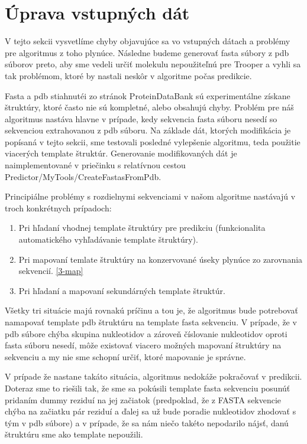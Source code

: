 \section{Úprava vstupných dát}
V tejto sekcii vysvetlíme chyby objavujúce sa vo vstupných dátach a problémy pre algoritmus z toho plynúce. Následne budeme generovať fasta súbory z pdb súborov preto, aby sme vedeli určiť molekulu nepoužiteľnú pre Trooper a vyhli sa tak problémom, ktoré by nastali neskôr v algoritme počas predikcie.


\indent Fasta a pdb stiahnutéi zo stránok ProteinDataBank sú experimentálne získane štruktúry, ktoré často nie sú kompletné, alebo obsahujú chyby. Problém pre náš algoritmus nastáva hlavne v prípade, kedy sekvencia fasta súboru nesedí so sekvenciou extrahovanou z pdb súboru. Na základe dát, ktorých modifikácia je popísaná v tejto sekcii, sme testovali posledné vylepšenie algoritmu, teda použitie viacerých template štruktúr. Generovanie modifikovaných dát je naimplementované v priečinku s relatívnou cestou Predictor/MyTools/CreateFastasFromPdb.


\indent Principiálne problémy s rozdielnymi sekvenciami v našom algoritme nastávajú v troch konkrétnych prípadoch: 

\begin{enumerate}
\item Pri hľadaní vhodnej template štruktúry pre predikciu (funkcionalita automatického vyhľadávanie template štruktúry).
\item Pri mapovaní temlate štruktúry na konzervované úseky plynúce zo zarovnania sekvencií. \autoref{3-map}
\item Pri hľadaní a mapovaní sekundárných template štruktúr. 
\end{enumerate}

\indent Všetky tri situácie majú rovnakú príčinu a tou je, že algoritmus bude potrebovať namapovať template pdb štruktúru na template fasta sekvenciu. V prípade, že v pdb súbore chýba skupina nukleotidov a zároveň číslovanie nukleotidov oproti fasta súboru nesedí, môže existovať viacero možných mapovaní štruktúry na sekvenciu a my nie sme schopní určiť, ktoré mapovanie je správne.


\indent V prípade že nastane takáto situácia, algoritmus nedokáže pokračovať v predikcii. Doteraz sme to riešili tak, že sme sa pokúsili template fasta sekvenciu posunúť pridaním dummy reziduí na jej začiatok (predpoklad, že z FASTA sekvencie chýba na začiatku pár reziduí a ďalej sa už bude poradie nukleotidov zhodovať s tým v pdb súbore) a v prípade, že sa nám niečo takéto nepodarilo nájsť, danú štruktúru sme ako template nepoužili.


